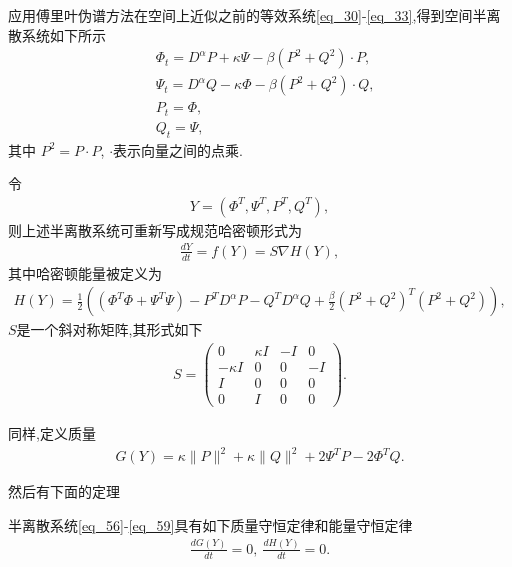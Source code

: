 应用傅里叶伪谱方法在空间上近似之前的等效系统\eqref{eq_30}-\eqref{eq_33},得到空间半离散系统如下所示\begin{align}
&\varPhi_{t}=D^{\alpha}P+\kappa \Psi-\beta \left( P^{2}+Q^{2}\right)\cdot P,\label{eq_56}\\
&\Psi_{t}=D^{\alpha}Q-\kappa \varPhi-\beta \left( P^{2}+Q^{2}\right)\cdot Q,\label{eq_57}\\
&P_t=\varPhi,\label{eq_58}\\
&Q_t=\Psi,\label{eq_59}
\end{align}
其中 $P^{2}=P \cdot P$, $\cdot$表示向量之间的点乘.

令
\begin{align}\label{eq_60a}
Y=\left(\varPhi^{T}, \Psi^{T}, P^{T}, Q^{T}\right),
\end{align}
则上述半离散系统可重新写成规范哈密顿形式为\begin{align}\label{eq_60}
\frac{d Y}{d t}=f(Y)=S \nabla H(Y),
\end{align}
其中哈密顿能量被定义为
\begin{align}\label{eq_61}
	H(Y)=\frac{1}{2}\left((\varPhi^{T}\varPhi+\Psi^{T}\Psi)-P^{T} D^{\alpha} P-Q^{T} D^{\alpha} Q+\frac{\beta}{2}(P^2+Q^2)^{T}(P^2+Q^2)\right),
\end{align}
$S$是一个斜对称矩阵,其形式如下
\begin{align}\label{eq_62}
S=\left(\begin{array}{cccc}
0 & \kappa I & -I & 0 \\
-\kappa I & 0 & 0 & -I \\
I & 0 & 0 & 0 \\
0 & I & 0 & 0
\end{array}\right).
\end{align}

同样,定义质量
\begin{align}\label{eq_63}
G(Y)=\kappa\|P\|^{2}+\kappa\|Q\|^{2} +2\Psi^{T}P-2\varPhi^{T}Q.
\end{align}

然后有下面的定理
\begin{theorem}	\label{thm3}
半离散系统\eqref{eq_56}-\eqref{eq_59}具有如下质量守恒定律和能量守恒定律
\begin{align}
\frac{d G(Y)}{d t}=0,~\frac{d H(Y)}{d t}=0.
\end{align}
\end{theorem}

